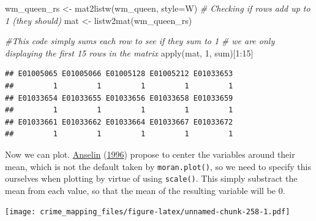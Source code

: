 \documentclass[
  krantz2]{krantz}
\makeatletter
\newenvironment{Shaded}{\begin{snugshade}}{\end{snugshade}}
\newcommand{\AttributeTok}[1]{\textcolor[rgb]{0.61,0.61,0.61}{#1}}
\newcommand{\CommentTok}[1]{\textcolor[rgb]{0.37,0.37,0.37}{\textit{#1}}}
\newcommand{\DecValTok}[1]{\textcolor[rgb]{0.06,0.06,0.06}{#1}}
\newcommand{\FunctionTok}[1]{\textcolor[rgb]{0,0,0}{#1}}
\newcommand{\NormalTok}[1]{#1}
\newcommand{\OtherTok}[1]{\textcolor[rgb]{0.37,0.37,0.37}{#1}}
\newcommand{\SpecialCharTok}[1]{\textcolor[rgb]{0,0,0}{#1}}
\newcommand{\StringTok}[1]{\textcolor[rgb]{0.5,0.5,0.5}{#1}}
\newenvironment{kframe}{%
\medskip{}
\setlength{\fboxsep}{.8em}
 \def\at@end@of@kframe{}%
 \ifinner\ifhmode%
  \def\at@end@of@kframe{\end{minipage}}%
  \begin{minipage}{\columnwidth}%
 \fi\fi%
 \def\FrameCommand##1{\hskip\@totalleftmargin \hskip-\fboxsep
 \colorbox{shadecolor}{##1}\hskip-\fboxsep
     \hskip-\linewidth \hskip-\@totalleftmargin \hskip\columnwidth}%
 \MakeFramed {\advance\hsize-\width
   \@totalleftmargin\z@ \linewidth\hsize
   \@setminipage}}%
 {\par\unskip\endMakeFramed%
 \at@end@of@kframe}
\renewenvironment{Shaded}{\begin{kframe}}{\end{kframe}}
\makeatother
\begin{document}
\begin{Shaded}
\begin{Highlighting}[]
\NormalTok{wm\_queen\_rs }\OtherTok{\textless{}{-}} \FunctionTok{mat2listw}\NormalTok{(wm\_queen, }\AttributeTok{style=}\StringTok{\textquotesingle{}W\textquotesingle{}}\NormalTok{)}
\CommentTok{\# Checking if rows add up to 1 (they should)}
\NormalTok{mat }\OtherTok{\textless{}{-}} \FunctionTok{listw2mat}\NormalTok{(wm\_queen\_rs)}

\CommentTok{\#This code simply sums each row to see if they sum to 1}
\CommentTok{\# we are only displaying the first 15 rows in the matrix}
\FunctionTok{apply}\NormalTok{(mat, }\DecValTok{1}\NormalTok{, sum)[}\DecValTok{1}\SpecialCharTok{:}\DecValTok{15}\NormalTok{]}
\end{Highlighting}
\end{Shaded}

\begin{verbatim}
## E01005065 E01005066 E01005128 E01005212 E01033653 
##         1         1         1         1         1 
## E01033654 E01033655 E01033656 E01033658 E01033659 
##         1         1         1         1         1 
## E01033661 E01033662 E01033664 E01033667 E01033672 
##         1         1         1         1         1
\end{verbatim}

Now we can plot. \protect\hyperlink{ref-Anselin_1996}{Anselin} (\protect\hyperlink{ref-Anselin_1996}{1996}) propose to center the variables around their mean, which is not the default taken by \texttt{moran.plot()}, so we need to specify this ourselves when plotting by virtue of using \texttt{scale()}. This simply substract the mean from each value, so that the mean of the resulting variable will be 0.

\begin{Shaded}
\end{Shaded}

\texttt{[image: crime\_mapping\_files/figure-latex/unnamed-chunk-258-1.pdf]}
\end{document}
